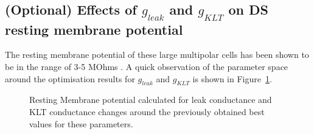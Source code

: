 


\subsection{(Optional) Effects of $g_{leak}$ and $g_{KLT}$ on DS resting membrane
  potential}\label{sec:DS:effects-g_leak-g_lkt}



The resting membrane potential of these large multipolar cells has been shown to
be in the range of 3-5 MOhms . A quick
observation of the parameter space around the optimisation results for
$g_{leak}$ and $g_{KLT}$ is shown in Figure~\ref{fig:leakVltk}.

\begin{figure}[h!]
  \centering 
{}
  \caption{Resting Membrane potential calculated for leak conductance and KLT
    conductance changes around the previously obtained best values for these
    parameters.}\label{fig:leakVltk}
\end{figure}




